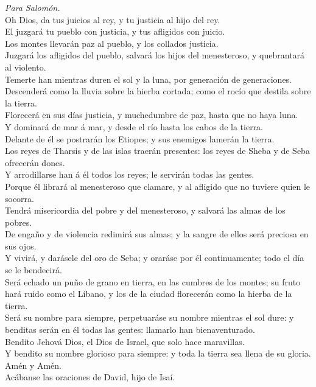  \emph{Para Salomón.}\\
Oh Dios, da tus juicios al rey, y tu justicia al hijo del rey.\\
 El juzgará tu pueblo con justicia, y tus afligidos con
juicio.\\
 Los montes llevarán paz al pueblo, y los collados
justicia.\\
 Juzgará los afligidos del pueblo, salvará los hijos del
menesteroso, y quebrantará al violento.\\
 Temerte han mientras duren el sol y la luna, por generación
de generaciones.\\
 Descenderá como la lluvia sobre la hierba cortada; como el
rocío que destila sobre la tierra.\\
 Florecerá en sus días justicia, y muchedumbre de paz, hasta
que no haya luna.\\
 Y dominará de mar á mar, y desde el río hasta los cabos de
la tierra.\\
 Delante de él se postrarán los Etiopes; y sus enemigos
lamerán la tierra.\\
 Los reyes de Tharsis y de las islas traerán presentes: los
reyes de Sheba y de Seba ofrecerán dones.\\
 Y arrodillarse han á él todos los reyes; le servirán todas
las gentes.\\
 Porque él librará al menesteroso que clamare, y al
afligido que no tuviere quien le socorra.\\
 Tendrá misericordia del pobre y del menesteroso, y salvará
las almas de los pobres.\\
 De engaño y de violencia redimirá sus almas; y la sangre
de ellos será preciosa en sus ojos.\\
 Y vivirá, y darásele del oro de Seba; y oraráse por él
continuamente; todo el día se le bendecirá.\\
 Será echado un puño de grano en tierra, en las cumbres de
los montes; su fruto hará ruido como el Líbano, y los de la ciudad
florecerán como la hierba de la tierra.\\
 Será su nombre para siempre, perpetuaráse su nombre
mientras el sol dure: y benditas serán en él todas las gentes: llamarlo
han bienaventurado.\\
 Bendito Jehová Dios, el Dios de Israel, que solo hace
maravillas.\\
 Y bendito su nombre glorioso para siempre: y toda la
tierra sea llena de su gloria. Amén y Amén.\\
 Acábanse las oraciones de David, hijo de Isaí.

